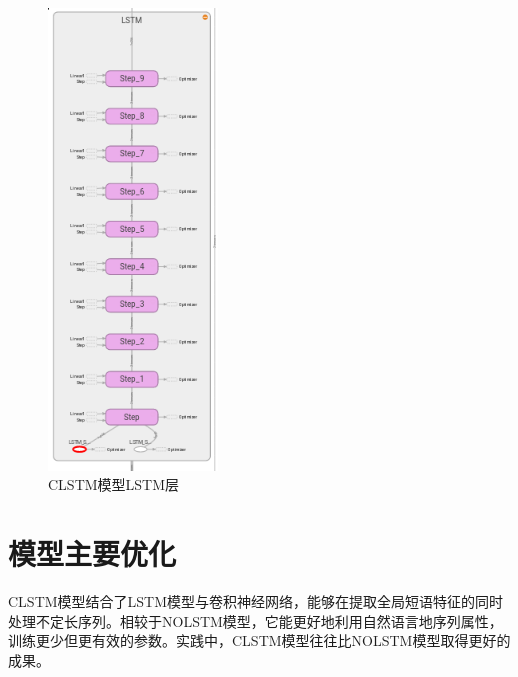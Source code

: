 \begin{figure}[!hbp]
\begin{center}
\includegraphics[width=0.4\textwidth]{graphic/clstm2.png}
\caption{CLSTM模型LSTM层 \label{clstm2}}
\end{center}
\end{figure}
\section{模型主要优化}
CLSTM模型结合了LSTM模型与卷积神经网络，能够在提取全局短语特征的同时处理不定长序列。相较于NOLSTM模型，它能更好地利用自然语言地序列属性，训练更少但更有效的参数。实践中，CLSTM模型往往比NOLSTM模型取得更好的成果。